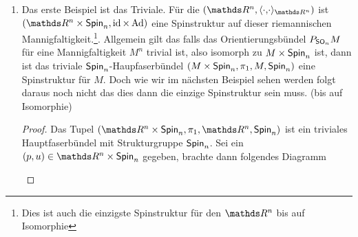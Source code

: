 \begin{Bsp}
	\begin{enumerate}[(1)]
		\item Das erste Beispiel ist das Triviale. Für die \RMF $(\R^n, \scdots_{\R^n})$ ist $(\R^n \times \spin{n},\id \times \Ad)$ 
		eine Spinstruktur auf dieser riemannischen 
		Mannigfaltigkeit.\footnote{Dies ist auch die einzigste Spinstruktur für den $ \R^n $ bis auf Isomorphie}. Allgemein gilt das falls 
		das Orientierungsbündel  $ P_{\operatorname{\sf SO}_{ n }}M $ für eine
		Mannigfaltigkeit $ M^n $ trivial ist, also isomorph zu $ M\times \operatorname{\sf Spin}_{ n } $ ist, dann ist das triviale $ \operatorname{\sf Spin}_{ n } $-Haupfaserbündel
		$ (M\times \operatorname{\sf Spin}_{ n },\pi_1,M,\operatorname{\sf Spin}_{ n }) $ eine Spinstruktur für $ M $.
		Doch wie wir im nächsten Beispiel sehen werden folgt daraus noch nicht
		das dies dann die einzige Spinstruktur sein muss. (bis auf Isomorphie)
		\begin{proof}
			Das Tupel $ (\R^n\times \spin{n},\pi_1,\R^n,\spin{n}) $ ist ein triviales
			Hauptfaserbündel mit Strukturgruppe $ \operatorname{\sf Spin}_{ n } $.
			Sei ein $ (p,u)\in \R^n\times \spin{n} $ gegeben, brachte dann
			folgendes Diagramm
			
				\begin{center}
					
		\end{center}

		\end{proof}
		

\end{enumerate}
\end{Bsp}
